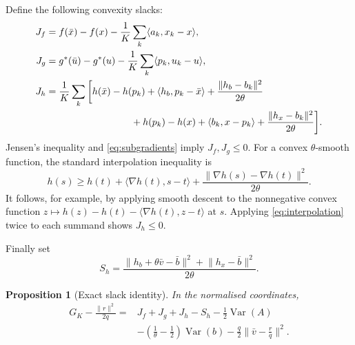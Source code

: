 \documentclass[11pt,a4paper]{article}
\newtheorem{proposition}[theorem]{Proposition}
\theoremstyle{remark}\newtheorem{remark}[theorem]{Remark}
\DeclareMathOperator{\Var}{Var}
\newcommand{\ip}[2]{\langle #1,#2\rangle}
\newcommand{\norm}[1]{\lVert #1\rVert}
\begin{document}
Define the following convexity slacks:
\begin{align}
J_f&=f(\bar x)-f(x)-\frac1K\sum_k\ip{a_k}{x_k-x},\label{eq:jf}\\
J_g&=g^*(\bar u)-g^*(u)-\frac1K\sum_k\ip{p_k}{u_k-u},\label{eq:jg}\\
J_h&=\frac1K\sum_k\bigg[
h(\bar x)-h(p_k)+\ip{h_b}{p_k-\bar x}
+\frac{\norm{h_b-b_k}^2}{2\theta}\nonumber\\
&\hspace{31mm}+h(p_k)-h(x)+\ip{b_k}{x-p_k}
+\frac{\norm{h_x-b_k}^2}{2\theta}\bigg].\label{eq:jh}
\end{align}
Jensen's inequality and \eqref{eq:subgradients} imply $J_f,J_g\le0$. For a convex $\theta$-smooth function, the standard interpolation inequality is
\begin{equation}\label{eq:interpolation}
h(s)\ge h(t)+\ip{\nabla h(t)}{s-t}
+\frac{\norm{\nabla h(s)-\nabla h(t)}^2}{2\theta}.
\end{equation}
It follows, for example, by applying smooth descent to the nonnegative convex function $z\mapsto h(z)-h(t)-\ip{\nabla h(t)}{z-t}$ at $s$. Applying \eqref{eq:interpolation} twice to each summand shows $J_h\le0$.

Finally set
\begin{equation}\label{eq:sh}
S_h=\frac{\norm{h_b+\theta\bar v-\bar b}^2+
\norm{h_x-\bar b}^2}{2\theta}.
\end{equation}

\begin{proposition}[Exact slack identity]\label{prop:identity}
In the normalised coordinates,
\begin{align}\label{eq:identity}
G_K-\frac{\norm r^2}{2q}
={}&J_f+J_g+J_h-S_h-\frac12\Var(A)\nonumber\\
&-\left(\frac1\theta-\frac12\right)\Var(b)
-\frac q2\norm{\bar v-\frac rq}^2.
\end{align}
\end{proposition}
\end{document}
